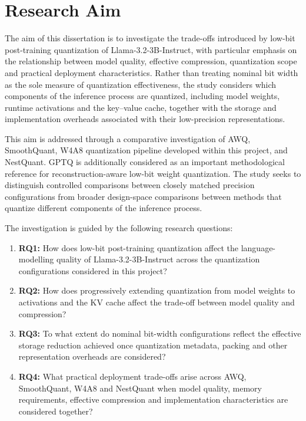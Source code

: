 \section{Research Aim}
The aim of this dissertation is to investigate the trade-offs introduced by low-bit post-training quantization of Llama-3.2-3B-Instruct, with particular emphasis on the relationship between model quality, effective compression, quantization scope and practical deployment characteristics. Rather than treating nominal bit width as the sole measure of quantization effectiveness, the study considers which components of the inference process are quantized, including model weights, runtime activations and the key--value cache, together with the storage and implementation overheads associated with their low-precision representations.

This aim is addressed through a comparative investigation of \ac{AWQ}, SmoothQuant, {W4A8} quantization pipeline developed within this project, and NestQuant. GPTQ is additionally considered as an important methodological reference for reconstruction-aware low-bit weight quantization. The study seeks to distinguish controlled comparisons between closely matched precision configurations from broader design-space comparisons between methods that quantize different components of the inference process.

The investigation is guided by the following research questions:

\begin{enumerate}
    \item \textbf{RQ1:} How does low-bit post-training quantization affect the language-modelling quality of Llama-3.2-3B-Instruct across the quantization configurations considered in this project?

    \item \textbf{RQ2:} How does progressively extending quantization from model weights to activations and the KV cache affect the trade-off between model quality and compression?

    \item \textbf{RQ3:} To what extent do nominal bit-width configurations reflect the effective storage reduction achieved once quantization metadata, packing and other representation overheads are considered?

    \item \textbf{RQ4:} What practical deployment trade-offs arise across AWQ, SmoothQuant, \ac{W4A8} and NestQuant when model quality, memory requirements, effective compression and implementation characteristics are considered together?
\end{enumerate}


